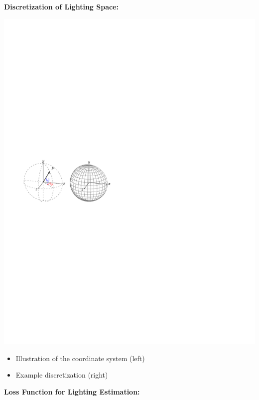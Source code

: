\documentclass[landscape,a0paper,fontscale=0.292]{baposter}
\begin{document}
\begin{poster}
{    \begin{minipage}[t]{0.48\linewidth}
        \textbf{\color{blue}Discretization of Lighting Space:}
        \vspace{-0.2em}
        \begin{center}
            \includegraphics[width=\textwidth]{images/lighting_discretization.pdf}
        \end{center}
        \vspace{-0.7em}
        \begin{itemize}
            \item Illustration of the coordinate system (left)
            \item Example discretization (right)
        \end{itemize}
    \end{minipage}
    \hfill
    \begin{minipage}[t]{0.48\linewidth}
        \textbf{\color{blue}Loss Function for Lighting Estimation:}
        \vspace{-0.6em}

\end{minipage}}
\end{poster}
\end{document}
